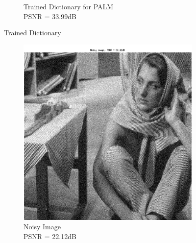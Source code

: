 \documentclass{article} %
\begin{document}
\begin{figure}[h]
\begin{subfigure}[b]{0.5\textwidth}
                \caption{Trained Dictionary for PALM\\PSNR = 33.99dB}
                \label{fig:DictPALM}
        \end{subfigure}
        \caption{Trained Dictionary}\label{fig:Dict}
\end{figure}

\begin{figure}[h]
        \centering
        \begin{subfigure}[b]{0.5\textwidth}
                \includegraphics[width=\textwidth]{images/Noisy}
                \caption{Noisy Image\\PSNR = 22.12dB}
                \label{fig:NoisyIm}
        \end{subfigure}%
        ~ %
        \begin{subfigure}[b]{0.5\textwidth}

\end{subfigure}
\end{figure}
\end{document}
